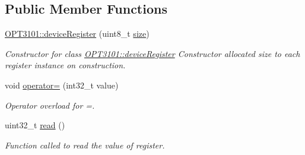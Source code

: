 \subsection*{Public Member Functions}
\begin{DoxyCompactItemize}
\item 
\mbox{\hyperlink{class_o_p_t3101_1_1device_register_a78bf911477c1d96731b716db7ea83dcb}{O\+P\+T3101\+::device\+Register}} (uint8\+\_\+t \mbox{\hyperlink{class_o_p_t3101_1_1device_register_a058d48b4c23e22739b1c65d85367a0a8}{size}})
\begin{DoxyCompactList}\small\item\em Constructor for class \mbox{\hyperlink{class_o_p_t3101_1_1device_register}{O\+P\+T3101\+::device\+Register}} Constructor allocated size to each register instance on construction. \end{DoxyCompactList}\item 
void \mbox{\hyperlink{class_o_p_t3101_1_1device_register_a0b3153b2ccbe96d37c247c605d6ba995}{operator=}} (int32\+\_\+t value)
\begin{DoxyCompactList}\small\item\em Operator overload for \textquotesingle{}=\textquotesingle{}. \end{DoxyCompactList}\item 
uint32\+\_\+t \mbox{\hyperlink{class_o_p_t3101_1_1device_register_a7092e4906eaff27555bc589eaf737493}{read}} ()
\begin{DoxyCompactList}\small\item\em Function called to read the value of register. \end{DoxyCompactList}\end{DoxyCompactItemize}
